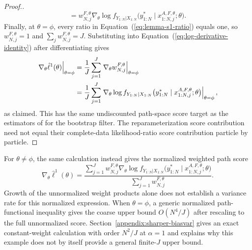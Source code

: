 \begin{proof}[Proof.]
\begin{equation}
=w_{N,j}^{F,\theta}\nabla_\theta\log f_{Y_{1:N}|X_{1:N}}
 \big(y_{1:N}^*\mid x_{1:N,j}^{A,F,\theta};\theta\big).
\label{eq:lemma-s1-filtered-score}
\end{equation}
Finally, at $\theta=\phi$, every ratio in
Equation~(\ref{eq:lemma-s1-ratio}) equals one, so
$w_{N,j}^{F,\theta}=1$ and $\sum_jw_{N,j}^{F,\theta}=J$.
Substituting into Equation~(\ref{eq:log-derivative-identity}) after
differentiating gives
\begin{align}
\left.\nabla_\theta\hat\ell^1(\theta)\right|_{\theta=\phi}
&=\frac1J\sum_{j=1}^{J}
 \left.\nabla_\theta w_{N,j}^{F,\theta}\right|_{\theta=\phi}
 \notag\\*
&=\frac1J\sum_{j=1}^{J}
 \left.\nabla_\theta\log f_{Y_{1:N}|X_{1:N}}
 \big(y_{1:N}^*\mid x_{1:N,j}^{A,F,\theta};\theta\big)
 \right|_{\theta=\phi},
\end{align}
as claimed.
This has the same undiscounted path-space score target as the estimators of
\cite{poyiadjis11, scibior21} for the bootstrap filter. The
reparameterization score contribution need not equal their complete-data
likelihood-ratio score contribution particle by particle.
\end{proof}

For $\theta\neq\phi$, the same calculation instead gives the normalized
weighted path score
\begin{equation}
\nabla_\theta\hat\ell^1(\theta)
=\frac{\displaystyle\sum_{j=1}^J w_{N,j}^{F,\theta}
\nabla_\theta\log f_{Y_{1:N}|X_{1:N}}
\big(y_{1:N}^*\mid x_{1:N,j}^{A,F,\theta};\theta\big)}
{\displaystyle\sum_{j=1}^J w_{N,j}^{F,\theta}}.
\end{equation}
Growth of the unnormalized weight products alone does not establish a
variance rate for this normalized expression.
When $\theta=\phi$, a generic normalized path-functional inequality gives
the coarse upper bound $O(N^4/J)$ after rescaling to the full
unnormalized score.  Section~\ref{appendix:sharper-biasvar} gives an exact
constant-weight calculation with order $N^2/J$ at $\alpha=1$ and explains
why this example does not by itself provide a general finite-$J$ upper
bound.

